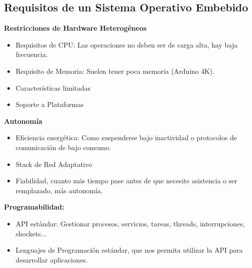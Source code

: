 \documentclass[12pt, twoside, openright]{report} %
\begin{document}
\subsection{Requisitos de un Sistema Operativo Embebido}
\textbf{Restricciones de Hardware Heterogéneos}
\begin{itemize}
	\item Requisitos de CPU: Las operaciones no deben ser de carga alta, hay baja frecuencia.
	\item Requisito de Memoria: Suelen tener poca memoria (Arduino 4K).
	\item Características limitadas
	\item Soporte a Plataformas
\end{itemize}

\textbf{Autonomía}
\begin{itemize}
	\item Eficiencia energética: Como suspenderse bajo inactividad o protocolos de comunicación de bajo consumo.
	\item Stack de Red Adaptativo
	\item Fiabilidad, cuanto más tiempo pase antes de que necesite asistencia o ser remplazado, más autonomía.
\end{itemize}

\textbf{Programabilidad:}
\begin{itemize}
	\item API estándar: Gestionar procesos, servicios, tareas, threads, interrupciones, shockets...
	\item Lenguajes de Programación estándar, que nos permita utilizar la API para desarrollar aplicaciones.
\end{itemize}
\end{document}
